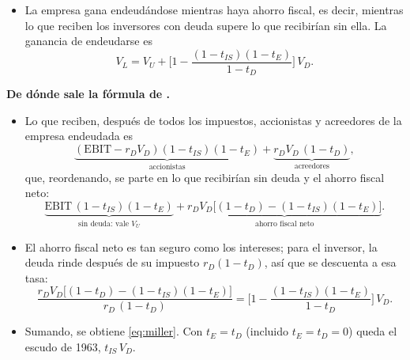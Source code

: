 \documentclass[11pt]{article}
\begin{document}
\begin{infografia}[H]
\centering
\caption{La lógica del efecto conjunto del impuesto sobre sociedades y del IRPF (, 1977)}\label{figu:miller}
\end{infografia}

\begin{itemize}
\item La empresa gana endeudándose mientras haya ahorro fiscal, es decir, mientras lo que reciben los inversores con deuda supere lo que recibirían sin ella. La ganancia de endeudarse es
  \begin{equation}\label{eq:miller}
  V_L=V_U+\Big[1-\frac{(1-t_{IS})(1-t_E)}{1-t_D}\Big]\,V_D.
  \end{equation}
\end{itemize}

\begin{anotaciones}
\textbf{De dónde sale la fórmula de .}
\begin{itemize}
\item Lo que reciben, después de todos los impuestos, accionistas y acreedores de la empresa endeudada es
  \[
  \underbrace{(\mathrm{EBIT}-r_DV_D)(1-t_{IS})(1-t_E)}_{\text{accionistas}}+\underbrace{r_DV_D\,(1-t_D)}_{\text{acreedores}},
  \]
  que, reordenando, se parte en lo que recibirían sin deuda y el ahorro fiscal neto:
  \[
  \underbrace{\mathrm{EBIT}\,(1-t_{IS})(1-t_E)}_{\text{sin deuda: vale }V_U}+\underbrace{r_DV_D\big[(1-t_D)-(1-t_{IS})(1-t_E)\big]}_{\text{ahorro fiscal neto}}.
  \]
\item El ahorro fiscal neto es tan seguro como los intereses; para el inversor, la deuda rinde después de su impuesto $r_D(1-t_D)$, así que se descuenta a esa tasa:
  \[
  \frac{r_DV_D\big[(1-t_D)-(1-t_{IS})(1-t_E)\big]}{r_D\,(1-t_D)}=\Big[1-\frac{(1-t_{IS})(1-t_E)}{1-t_D}\Big]\,V_D.
  \]
\item Sumando, se obtiene \eqref{eq:miller}. Con $t_E=t_D$ (incluido $t_E=t_D=0$) queda el escudo de 1963, $t_{IS}\,V_D$.\findemo
\end{itemize}
\end{anotaciones}
\end{document}

